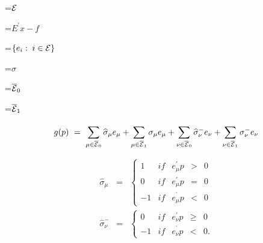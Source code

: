 {\newpage
\clearpage
\samepage \setbox\sizebox=\hbox{$\cal E$}\box\sizebox
}

{\newpage
\clearpage
\samepage \setbox\sizebox=\hbox{$E^{\prime}x-f$}\box\sizebox
}

{\newpage
\clearpage
\samepage \setbox\sizebox=\hbox{$\{ e_i: \; i \in \cal E \}$}\box\sizebox
}

{\newpage
\clearpage
\samepage \setbox\sizebox=\hbox{$\sigma$}\box\sizebox
}

{\newpage
\clearpage
\samepage \setbox\sizebox=\hbox{$\overline { \cal {E}}_0$}\box\sizebox
}

{\newpage
\clearpage
\samepage \setbox\sizebox=\hbox{$\overline { \cal {E}}_1$}\box\sizebox
}

{\newpage
\clearpage
\samepage \begin{equation}\label{eqn:gradient1}
g(p) \ =\ \sum_{\mu \in \overline{{\cal E}}_0}^{}\widehat{\sigma }_\mu e_\mu +\sum_{\mu \in \overline{{\cal E}}_1}^{}\sigma _\mu e_\mu
+\sum_{\nu \in \overline{{\cal E}}_0}^{}\widehat{\sigma }_\nu ^{-}e_\nu
+\sum_{\nu \in \overline{{\cal E}}_1}^{}\sigma _\nu ^{-}e_\nu 
\end{equation}
}

{\newpage
\clearpage
\samepage \begin{equation}\label{eqn:sigmahat} 
\begin{array}{lll}
\widehat{\sigma }_\mu & = & \left\{ 
\begin{array}{lllll}
1 & if & e_\mu ^{\prime }p & > & 0 \\  
0 & if & e_\mu ^{\prime }p & = & 0 \\  
-1 & if & e_\mu ^{^{\prime }}p & < & 0 
\end{array}
\right. \\  
\widehat{\sigma }_\nu ^{-} & = & \left\{ 
\begin{array}{lllll}
0 & if & e_\nu ^{\prime }p & \geq & 0 \\  
-1 & if & e_\nu ^{^{\prime }}p & < & 0 .
\end{array}
\right. 
\end{array}
\end{equation}
}

